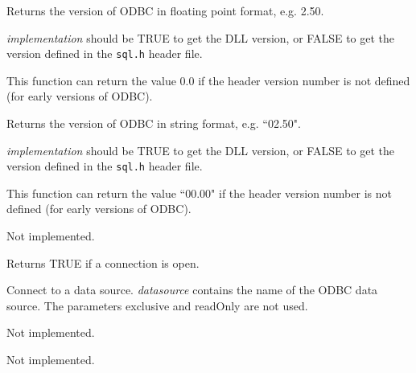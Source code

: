 Returns the version of ODBC in floating point format, e.g. 2.50.

{\it implementation} should be TRUE to get the DLL version, or FALSE to get the
version defined in the {\tt sql.h} header file.

This function can return the value 0.0 if the header version number is not defined (for early
versions of ODBC).



Returns the version of ODBC in string format, e.g. ``02.50".

{\it implementation} should be TRUE to get the DLL version, or FALSE to get the
version defined in the {\tt sql.h} header file.

This function can return the value ``00.00" if the header version number is not defined (for early
versions of ODBC).



Not implemented.



Returns TRUE if a connection is open.

\label{wxdatabaseopen}


Connect to a data source. {\it datasource} contains the name of the ODBC data
source. The parameters exclusive and readOnly are not used.



Not implemented.  



Not implemented.


